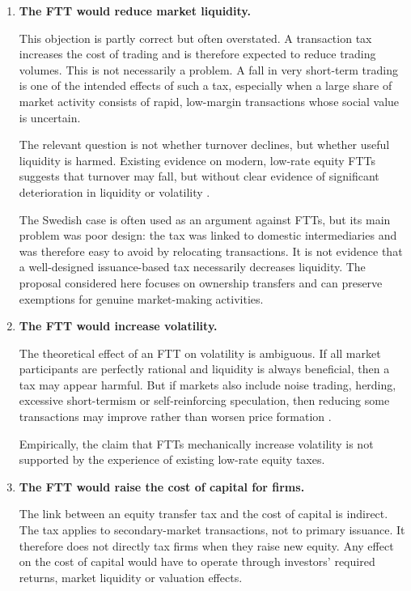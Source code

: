 \documentclass[../../main]{subfiles}
\begin{document}
\begin{enumerate}

    \item \textbf{The FTT would reduce market liquidity.}

    This objection is partly correct but often overstated. A transaction tax increases the cost of trading and is therefore expected to reduce trading volumes. This is not necessarily a problem. A fall in very short-term trading is one of the intended effects of such a tax, especially when a large share of market activity consists of rapid, low-margin transactions whose social value is uncertain.

    The relevant question is not whether turnover declines, but whether useful liquidity is harmed. Existing evidence on modern, low-rate equity FTTs suggests that turnover may fall, but without clear evidence of significant deterioration in liquidity or volatility \citep{IMF2010, ColliardHoffmann2017}. 
    
    The Swedish case is often used as an argument against FTTs, but its main problem was poor design: the tax was linked to domestic intermediaries and was therefore easy to avoid by relocating transactions. It is not evidence that a well-designed issuance-based tax necessarily decreases liquidity. The proposal considered here focuses on ownership transfers and can preserve exemptions for genuine market-making activities.

    \item \textbf{The FTT would increase volatility.}

    The theoretical effect of an FTT on volatility is ambiguous. If all market participants are perfectly rational and liquidity is always beneficial, then a tax may appear harmful. But if markets also include noise trading, herding, excessive short-termism or self-reinforcing speculation, then reducing some transactions may improve rather than worsen price formation \citep{Matheson2011, McCullochPacillo2011}.

    Empirically, the claim that FTTs mechanically increase volatility is not supported by the experience of existing low-rate equity taxes. 

    \item \textbf{The FTT would raise the cost of capital for firms.}

    The link between an equity transfer tax and the cost of capital is indirect. The tax applies to secondary-market transactions, not to primary issuance. It therefore does not directly tax firms when they raise new equity. Any effect on the cost of capital would have to operate through investors' required returns, market liquidity or valuation effects.


\end{enumerate}
\end{document}
